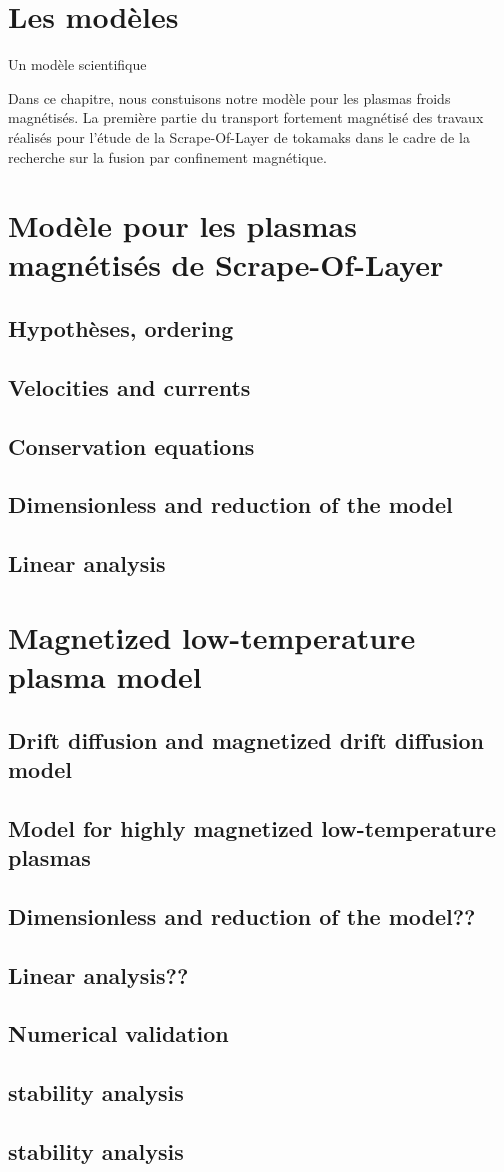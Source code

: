  	\section{Les modèles}
 	Un modèle scientifique
 	
	Dans ce chapitre, nous constuisons notre modèle pour les plasmas froids
	magnétisés. La première partie  du transport fortement
	magnétisé  des travaux réalisés pour l'étude de la Scrape-Of-Layer
	de tokamaks dans le cadre de la recherche sur la fusion par confinement magnétique.
	\section{Modèle pour les plasmas magnétisés de Scrape-Of-Layer}
	
	\subsection{Hypothèses, ordering}
		\subsection{Velocities and currents}
		\subsection{Conservation equations}
		\subsection{Dimensionless and reduction of the model}
		\subsection{Linear analysis}
	\section{Magnetized low-temperature plasma model}
		\subsection{Drift diffusion and magnetized drift diffusion model}
		\subsection{Model for highly magnetized low-temperature plasmas}
		\subsection{Dimensionless and reduction of the model??}
		\subsection{Linear analysis??}
		\subsection{Numerical validation}
		\subsection{stability analysis}
		\subsection{stability analysis}
